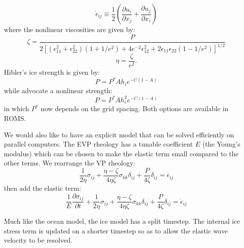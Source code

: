 \begin{equation}
  \dot \epsilon_{ij} \equiv \frac{1 }{ 2} \left( \frac{\partial u_i
  }{
  \partial x_j} + \frac{\partial u_j }{ \partial x_i} \right)
\end{equation}
where the nonlinear viscosities are given by:
\begin{equation}
\zeta = \frac{ P }{ 2 \left[ (\epsilon^2_{11} +
   \epsilon^2_{22} ) ( 1 + 1/e^2 ) + 4 e^{-2} \epsilon^2_{12}
      + 2 \epsilon_{11} \epsilon_{22} ( 1 - 1/e^2 ) \right] ^{1/2} }
\end{equation}
\begin{equation}
      \eta = \frac{ \zeta }{ e^2 }.
\end{equation}
Hibler's ice strength is given by:
\begin{equation}
  P = P^* A h_i e^{-C(1-A)}
\end{equation}
while \citet{Overland_1988} advocate a nonlinear strength:
\begin{equation}
  P = P^* A h_i^2 e^{-C(1-A)}
\end{equation}
in which $P^*$ now depends on the grid spacing. Both options are available
in ROMS.

We would also like to have an explicit model that can be solved
efficiently on parallel computers. The EVP rheology has a tunable
coefficient $E$ (the Young's modulus) which can be chosen to make
the elastic term small compared to the other terms. We rearrange the VP
rheology:
\begin{equation}
  \frac{1 }{ 2 \eta} \sigma_{ij} + \frac{\eta - \zeta }{ 4 \eta \zeta}
  \sigma_{kk} \delta_{ij} + \frac{P }{ 4 \zeta} \delta_{ij} = \dot
  \epsilon_{ij}
\end{equation}
then add the elastic term:
\begin{equation}
  \frac{1 }{ E} \frac{\partial \sigma_{ij} }{ \partial t} +
  \frac{1 }{ 2
  \eta} \sigma_{ij} + \frac{\eta - \zeta }{ 4 \eta \zeta} \sigma_{kk}
  \delta_{ij} + \frac{P }{ 4 \zeta} \delta_{ij} = \dot \epsilon_{ij}
\end{equation}

Much like the ocean model, the ice model has a split timestep. The
internal ice stress term is updated on a shorter timestep so as to
allow the elastic wave velocity to be resolved.

